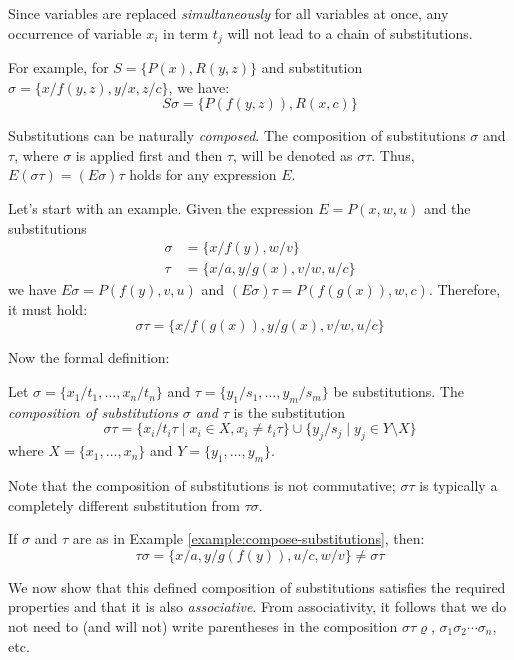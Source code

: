 Since variables are replaced \emph{simultaneously} for all variables at once, any occurrence of variable $x_i$ in term $t_j$ will not lead to a chain of substitutions.

\begin{example}
For example, for $S=\{P(x),R(y,z)\}$ and substitution $\sigma=\{x/f(y,z),y/x,z/c\}$, we have:
$$
S\sigma=\{P(f(y,z)),R(x,c)\}
$$
\end{example}

Substitutions can be naturally \emph{composed}. The composition of substitutions $\sigma$ and $\tau$, where $\sigma$ is applied first and then $\tau$, will be denoted as $\sigma\tau$. Thus, $E(\sigma\tau)=(E\sigma)\tau$ holds for any expression $E$.

\begin{example}\label{example:compose-substitutions}
    Let's start with an example. Given the expression $E=P(x,w,u)$ and the substitutions \begin{align*}
        \sigma&=\{x/f(y),w/v\}\\
        \tau&=\{x/a,y/g(x),v/w,u/c\}
    \end{align*}
    we have $E\sigma=P(f(y),v,u)$ and $(E\sigma)\tau=P(f(g(x)),w,c)$.
    Therefore, it must hold: 
    $$
    \sigma\tau=\{x/f(g(x)),y/g(x),v/w,u/c\}
    $$
\end{example}

Now the formal definition:

\begin{definition}
Let $\sigma=\{x_1/t_1,\dots,x_n/t_n\}$ and $\tau=\{y_1/s_1,\dots,y_m/s_m\}$ be substitutions. The \emph{composition of substitutions $\sigma$ and $\tau$} is the substitution
$$
\sigma\tau=\{x_i/t_i\tau\mid x_i\in X,x_i\neq t_i\tau\}\cup\{y_j/s_j\mid y_j\in Y\setminus X\}
$$
where $X=\{x_1,\dots,x_n\}$ and $Y=\{y_1,\dots,y_m\}$.
\end{definition}

Note that the composition of substitutions is not commutative; $\sigma\tau$ is typically a completely different substitution from $\tau\sigma$.

\begin{example}
    If $\sigma$ and $\tau$ are as in Example \ref{example:compose-substitutions}, then: 
    $$
    \tau\sigma=\{x/a,y/g(f(y)),u/c,w/v\}\neq \sigma\tau
    $$
\end{example}

We now show that this defined composition of substitutions satisfies the required properties and that it is also \emph{associative}. From associativity, it follows that we do not need to (and will not) write parentheses in the composition $\sigma\tau\varrho$, $\sigma_1\sigma_2\cdots\sigma_n$, etc.

